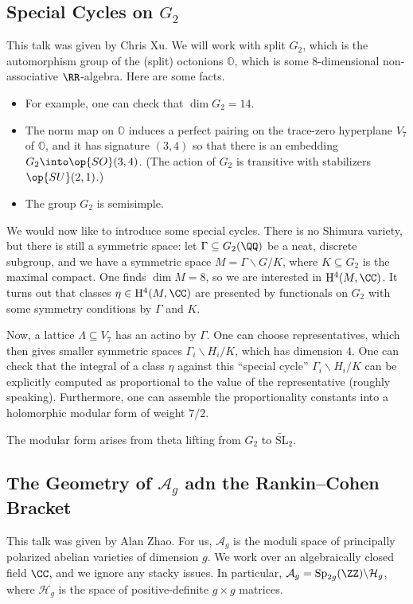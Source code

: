 \documentclass{article}
\begin{document}
\subsection{Special Cycles on \texorpdfstring{$G_2$}{ G2}}
This talk was given by Chris Xu. We will work with split $G_2$, which is the automorphism group of the (split) octonions $\mathbb O$, which is some $8$-dimensional non-associative $\RR$-algebra. Here are some facts.
\begin{itemize}
	\item For example, one can check that $\dim G_2=14$.
	\item The norm map on $\mathbb O$ induces a perfect pairing on the trace-zero hyperplane $V_7$ of $\mathbb O$, and it has signature $(3,4)$ so that there is an embedding $G_2\into\op{SO}(3,4)$. (The action of $G_2$ is transitive with stabilizers $\op{SU}(2,1)$.)
	\item The group $G_2$ is semisimple.
\end{itemize}
We would now like to introduce some special cycles. There is no Shimura variety, but there is still a symmetric space: let $\Gamma\subseteq G_2(\QQ)$ be a neat, discrete subgroup, and we have a symmetric space $M=\Gamma\backslash G/K$, where $K\subseteq G_2$ is the maximal compact. One finds $\dim M=8$, so we are interested in $\mathrm H^4(M,\CC)$. It turns out that classes $\eta\in\mathrm H^4(M,\CC)$ are presented by functionals on $G_2$ with some symmetry conditions by $\Gamma$ and $K$.

Now, a lattice $\Lambda\subseteq V_7$ has an actino by $\Gamma$. One can choose representatives, which then gives smaller symmetric spaces $\Gamma_i\backslash H_i/K$, which has dimension $4$. One can check that the integral of a class $\eta$ against this ``special cycle'' $\Gamma_i\backslash H_i/K$ can be explicitly computed as proportional to the value of the representative (roughly speaking). Furthermore, one can assemble the proportionality constants into a holomorphic modular form of weight $7/2$.
\begin{remark}
	The modular form arises from theta lifting from $G_2$ to $\widetilde{\mathrm{SL}}_2$.
\end{remark}

\subsection{The Geometry of \texorpdfstring{$\mathcal A_g$}{ Ag} adn the Rankin--Cohen Bracket}
This talk was given by Alan Zhao. For us, $\mathcal A_g$ is the moduli space of principally polarized abelian varieties of dimension $g$. We work over an algebraically closed field $\CC$, and we ignore any stacky issues. In particular, $\mathcal A_g=\mathrm{Sp}_{2g}(\ZZ)\backslash\mathcal H_g$, where $\mathcal H_g$ is the space of positive-definite $g\times g$ matrices.
\end{document}
